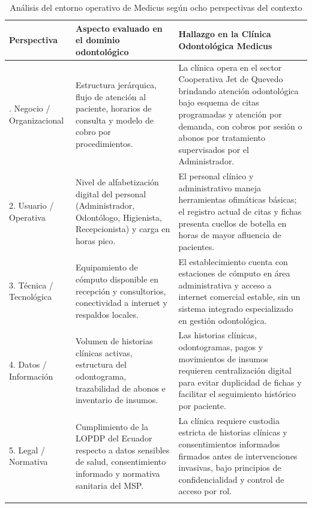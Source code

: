 \begin{table}[htbp]
\centering
\caption{Análisis del entorno operativo de Medicus según ocho perspectivas del contexto}
\label{tab:ocho_perspectivas}
\begingroup
\scriptsize
\setlength{\tabcolsep}{3pt}
\renewcommand{\arraystretch}{1.2}
\begin{tabularx}{\textwidth}{
>{\raggedright\arraybackslash}p{2.25cm}
>{\raggedright\arraybackslash}X
>{\raggedright\arraybackslash}X}
\toprule
\textbf{Perspectiva} &
\textbf{Aspecto evaluado en el dominio odontológico} &
\textbf{Hallazgo en la Clínica Odontológica Medicus}\\
\midrule

1. Negocio / Organizacional &
Estructura jerárquica, flujo de atención al paciente, horarios de consulta y modelo de cobro por procedimientos. &
La clínica opera en el sector Cooperativa Jet de Quevedo brindando atención odontológica bajo esquema de citas programadas y atención por demanda, con cobros por sesión o abonos por tratamiento supervisados por el Administrador.\\
\addlinespace

2. Usuario / Operativa &
Nivel de alfabetización digital del personal (Administrador, Odontólogo, Higienista, Recepcionista) y carga en horas pico. &
El personal clínico y administrativo maneja herramientas ofimáticas básicas; el registro actual de citas y fichas presenta cuellos de botella en horas de mayor afluencia de pacientes.\\
\addlinespace

3. Técnica / Tecnológica &
Equipamiento de cómputo disponible en recepción y consultorios, conectividad a internet y respaldos locales. &
El establecimiento cuenta con estaciones de cómputo en área administrativa y acceso a internet comercial estable, sin un sistema integrado especializado en gestión odontológica.\\
\addlinespace

4. Datos / Información &
Volumen de historias clínicas activas, estructura del odontograma, trazabilidad de abonos e inventario de insumos. &
Las historias clínicas, odontogramas, pagos y movimientos de insumos requieren centralización digital para evitar duplicidad de fichas y facilitar el seguimiento histórico por paciente.\\
\addlinespace

5. Legal / Normativa &
Cumplimiento de la LOPDP del Ecuador \cite{lopdp2021} respecto a datos sensibles de salud, consentimiento informado y normativa sanitaria del MSP. &
La clínica requiere custodia estricta de historias clínicas y consentimientos informados firmados antes de intervenciones invasivas, bajo principios de confidencialidad y control de acceso por rol.\\
\addlinespace


\end{tabularx}
\end{table}
